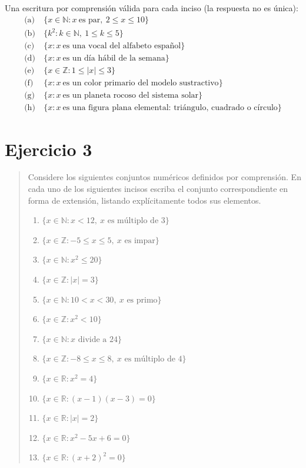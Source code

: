 \documentclass[11pt]{article}
\begin{document}
\begin{resp}
Una escritura por comprensión válida para cada inciso (la respuesta no es única):
\begin{align*}
	\text{(a)}\ & \{x\in\mathbb{N}: x\ \text{es par},\ 2\le x\le 10\}\\
	\text{(b)}\ & \{k^{2} : k\in\mathbb{N},\ 1\le k\le 5\}\\
	\text{(c)}\ & \{x : x\ \text{es una vocal del alfabeto español}\}\\
	\text{(d)}\ & \{x : x\ \text{es un día hábil de la semana}\}\\
	\text{(e)}\ & \{x\in\mathbb{Z}: 1\le |x|\le 3\}\\
	\text{(f)}\ & \{x : x\ \text{es un color primario del modelo sustractivo}\}\\
	\text{(g)}\ & \{x : x\ \text{es un planeta rocoso del sistema solar}\}\\
	\text{(h)}\ & \{x : x\ \text{es una figura plana elemental: triángulo, cuadrado o círculo}\}
\end{align*}
\end{resp}

\section*{Ejercicio 3}

\begin{quote}
Considere los siguientes conjuntos numéricos definidos por comprensión. En cada uno de los
siguientes incisos escriba el conjunto correspondiente en forma de extensión, listando
explícitamente todos sus elementos.

\begin{enumerate}[label=(\alph*),leftmargin=*]
	\item $\{x\in\mathbb{N}: x<12,\ x \text{ es múltiplo de } 3\}$
	\item $\{x\in\mathbb{Z}: -5\le x\le 5,\ x \text{ es impar}\}$
	\item $\{x\in\mathbb{N}: x^{2}\le 20\}$
	\item $\{x\in\mathbb{Z}: |x|=3\}$
	\item $\{x\in\mathbb{N}: 10<x<30,\ x \text{ es primo}\}$
	\item $\{x\in\mathbb{Z}: x^{2}<10\}$
	\item $\{x\in\mathbb{N}: x \text{ divide a } 24\}$
	\item $\{x\in\mathbb{Z}: -8\le x\le 8,\ x \text{ es múltiplo de } 4\}$
	\item $\{x\in\mathbb{R}: x^{2}=4\}$
	\item $\{x\in\mathbb{R}: (x-1)(x-3)=0\}$
	\item $\{x\in\mathbb{R}: |x|=2\}$
	\item $\{x\in\mathbb{R}: x^{2}-5x+6=0\}$
	\item $\{x\in\mathbb{R}: (x+2)^{2}=0\}$
\end{enumerate}
\end{quote}
\end{document}
